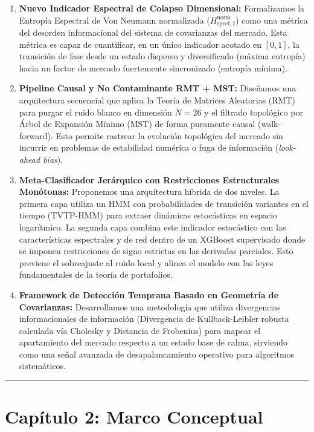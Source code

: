 \documentclass[
  12pt,
]{article}
\providecommand{\tightlist}{%
  \setlength{\itemsep}{0pt}\setlength{\parskip}{0pt}}
\begin{document}
\begin{enumerate}
\def\labelenumi{\arabic{enumi}.}
\tightlist
\item
  \textbf{Nuevo Indicador Espectral de Colapso Dimensional:}
  Formalizamos la Entropía Espectral de Von Neumann normalizada
  (\(H_{\text{spect}, t}^{\text{norm}}\)) como una métrica del desorden
  informacional del sistema de covarianzas del mercado. Esta métrica es
  capaz de cuantificar, en un único indicador acotado en \([0, 1]\), la
  transición de fase desde un estado disperso y diversificado (máxima
  entropía) hacia un factor de mercado fuertemente sincronizado
  (entropía mínima).
\item
  \textbf{Pipeline Causal y No Contaminante RMT + MST:} Diseñamos una
  arquitectura secuencial que aplica la Teoría de Matrices Aleatorias
  (RMT) para purgar el ruido blanco en dimensión \(N=26\) y el filtrado
  topológico por Árbol de Expansión Mínimo (MST) de forma puramente
  causal (walk-forward). Esto permite rastrear la evolución topológica
  del mercado sin incurrir en problemas de estabilidad numérica o fuga
  de información (\emph{look-ahead bias}).
\item
  \textbf{Meta-Clasificador Jerárquico con Restricciones Estructurales
  Monótonas:} Proponemos una arquitectura híbrida de dos niveles. La
  primera capa utiliza un HMM con probabilidades de transición variantes
  en el tiempo (TVTP-HMM) para extraer dinámicas estocásticas en espacio
  logarítmico. La segunda capa combina este indicador estocástico con
  las características espectrales y de red dentro de un XGBoost
  supervisado donde se imponen restricciones de signo estrictas en las
  derivadas parciales. Esto previene el sobreajuste al ruido local y
  alinea el modelo con las leyes fundamentales de la teoría de
  portafolios.
\item
  \textbf{Framework de Detección Temprana Basado en Geometría de
  Covarianzas:} Desarrollamos una metodología que utiliza divergencias
  informacionales de información (Divergencia de Kullback-Leibler
  robusta calculada vía Cholesky y Distancia de Frobenius) para mapear
  el apartamiento del mercado respecto a un estado base de calma,
  sirviendo como una señal avanzada de desapalancamiento operativo para
  algoritmos sistemáticos.
\end{enumerate}

\begin{center}\rule{0.5\linewidth}{0.5pt}\end{center}

\section{Capítulo 2: Marco
Conceptual}\label{capuxedtulo-2-marco-conceptual}
\end{document}
